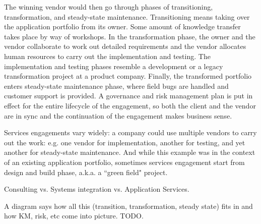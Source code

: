 The winning vendor would then go through phases of transitioning, transformation, and steady-state maintenance. Transitioning means taking over the application portfolio from its owner. Some amount of knowledge transfer takes place by way of workshops. In the transformation phase, the owner and the vendor collaborate to work out detailed requirements and the vendor allocates human resources to carry out the implementation and testing. The implementation and testing phases resemble a development or a legacy transformation project at a product company.  Finally, the transformed portfolio enters steady-state maintenance phase, where field bugs are handled and customer support is provided.  A governance and risk management plan is put in effect for the entire lifecycle of the engagement, so both the client and the vendor are in sync and the continuation of the engagement makes business sense.

Services engagements vary widely: a company could use multiple vendors to carry out the work: e.g. one vendor for implementation, another for testing, and yet another for steady-state maintenance.  And while this example was in the context of an existing application portfolio, sometimes services engagement start from design and build phase, a.k.a. a ``green field" project.

Consulting vs. Systems integration vs. Application Services.

%
%
%

A diagram says how all this (transition, transformation, steady state) fits in and how KM, risk, etc come into picture. TODO.

